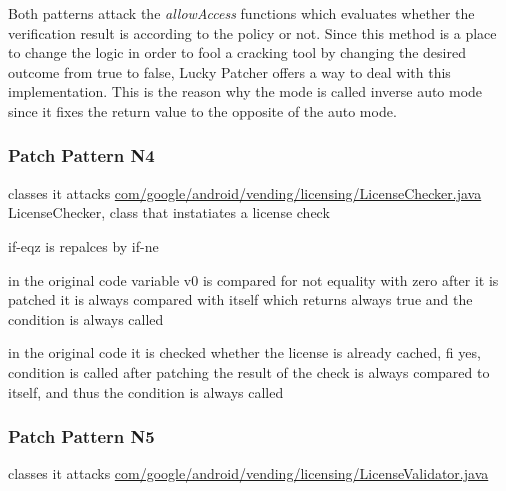 Both patterns attack the \textit{allowAccess} functions which evaluates whether the verification result is according to the policy or not.
Since this method is a place to change the logic in order to fool a cracking tool by changing the desired outcome from true to false, Lucky Patcher offers a way to deal with this implementation.
This is the reason why the mode is called inverse auto mode since it fixes the return value to the opposite of the auto mode.
\subsubsection{Patch Pattern N4}

classes it attacks %
\url{com/google/android/vending/licensing/LicenseChecker.java}
LicenseChecker, class that instatiates a license check\cite{developersLicensingReference}



if-eqz is repalces by if-ne


in the original code variable v0 is compared for not equality with zero
after it is patched it is always compared with itself which returns always true and the condition is always called



in the original code it is checked whether the license is already cached, fi yes, condition is called
after patching the result of the check is always compared to itself, and thus  the condition is always called
\subsubsection{Patch Pattern N5}
classes it attacks %
\url{com/google/android/vending/licensing/LicenseValidator.java}

